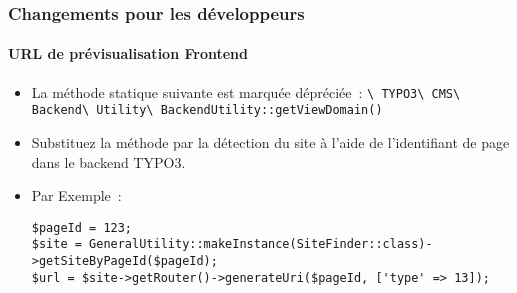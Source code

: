 \begin{frame}[fragile]
	\frametitle{Changements pour les développeurs}
	\framesubtitle{URL de prévisualisation Frontend}

	\lstset{basicstyle=\tiny\ttfamily}

	\begin{itemize}
		\item La méthode statique suivante est marquée dépréciée~:\newline
			\smaller\texttt{\textbackslash
				TYPO3\textbackslash
				CMS\textbackslash
				Backend\textbackslash
				Utility\textbackslash
				BackendUtility::getViewDomain()}\normalsize

		\item Substituez la méthode par la détection du site à l'aide de l'identifiant de
			page dans le backend TYPO3.
		\item Par Exemple~:

\begin{lstlisting}
$pageId = 123;
$site = GeneralUtility::makeInstance(SiteFinder::class)->getSiteByPageId($pageId);
$url = $site->getRouter()->generateUri($pageId, ['type' => 13]);
\end{lstlisting}

	\end{itemize}

\end{frame}


